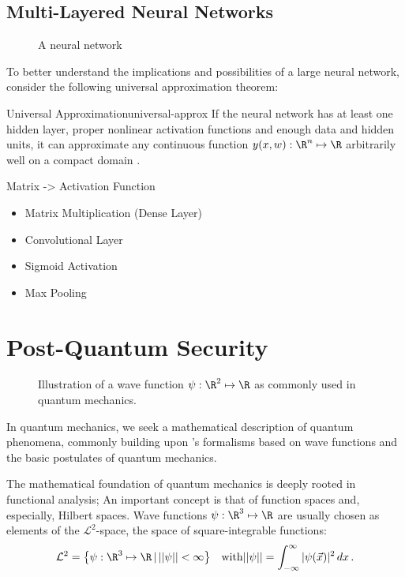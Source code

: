 \subsection{Multi-Layered Neural Networks}
\begin{figure}[H]
  \centering
  \caption{A neural network}
\end{figure}

To better understand the implications and possibilities of a large neural network, consider the following universal approximation theorem:

\begin{theorem}{Universal Approximation}{universal-approx}
  If the neural network has at least one hidden layer, proper nonlinear activation functions and enough data and hidden units, it can approximate any continuous function $y(x, w): \R^n \mapsto \R$ arbitrarily well on a compact domain \parencite{1989-HornikMultilayerFN}.
\end{theorem}

Matrix -> Activation Function
\begin{itemize}
  \item Matrix Multiplication (Dense Layer)
  \item Convolutional Layer
  \item Sigmoid Activation
  \item Max Pooling
\end{itemize}


\section{Post-Quantum Security}
\label{sec:post-quantum-sec}
\begin{figure}[H]
  \centering
  \caption{Illustration of a wave function $\psi: \R^2 \mapsto \R$ as commonly used in quantum mechanics.}
\end{figure}

In quantum mechanics, we seek a mathematical description of quantum phenomena, commonly building upon 's formalisms based on wave functions and the basic postulates of quantum mechanics.

The mathematical foundation of quantum mechanics is deeply rooted in functional analysis;
An important concept is that of function spaces and, especially, Hilbert spaces.
Wave functions $\psi: \R^3 \mapsto \R$ are usually chosen as elements of the $\mathcal{L}^2$-space, the space of square-integrable functions:
$$\mathcal{L}^2 = \big\{\psi: \R^3 \mapsto \R \,|\, ||\psi|| < \infty\big\} \quad \text{with} ||\psi|| = \int_{-\infty}^{\infty} |\psi(\vec{x})|^2 \,dx \,.$$

